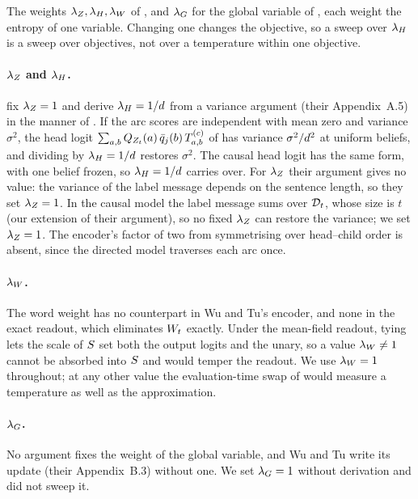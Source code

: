 The weights $\lambda_Z,\lambda_H,\lambda_W$ of , and $\lambda_G$ for the global
variable of , each weight the entropy of one variable. Changing one changes
the objective, so a sweep over $\lambda_H$ is a sweep over objectives, not over a temperature within
one objective.

\paragraph{$\lambda_Z$ and $\lambda_H$.}
\citet{wu2023probabilistic} fix $\lambda_Z = 1$ and derive $\lambda_H = 1/d$ from a variance
argument (their Appendix~A.5) in the manner of \citet{vaswani2017attention}. If the arc scores
are independent with mean zero and variance $\sigma^2$, the head logit
$\sum_{a,b} Q_{Z_{t}}(a)\,\bar{q}_{j}(b)\,T^{(c)}_{a,b}$ of  has variance
$\sigma^2/d^2$ at uniform beliefs, and dividing by $\lambda_H = 1/d$ restores $\sigma^2$.
The causal head logit has the same form, with one belief frozen, so $\lambda_H = 1/d$ carries
over. For $\lambda_Z$ their argument gives no value: the variance of the label message depends on the
sentence length, so they set $\lambda_Z=1$. In the causal model the label message sums over
$\mathcal{D}_{t}$, whose size is $t$ (our extension of their argument), so no fixed $\lambda_Z$ can restore
the variance; we set $\lambda_Z=1$. The encoder's factor of two from symmetrising over head--child
order is absent, since the directed model traverses each arc once.

\paragraph{$\lambda_W$.}
The word weight has no counterpart in Wu and Tu's encoder, and none in the exact readout, which
eliminates $W_{t}$ exactly. Under the mean-field readout, tying lets the scale of $S$ set
both the output logits and the unary, so a value $\lambda_W \ne 1$ cannot be absorbed into $S$
and would temper the readout. We use $\lambda_W=1$ throughout; at any other value the
evaluation-time swap of  would measure a temperature as well as the
approximation.

\paragraph{$\lambda_G$.}
No argument fixes the weight of the global variable, and Wu and Tu write its update (their
Appendix~B.3) without one. We set $\lambda_G = 1$ without derivation and did not sweep it.

